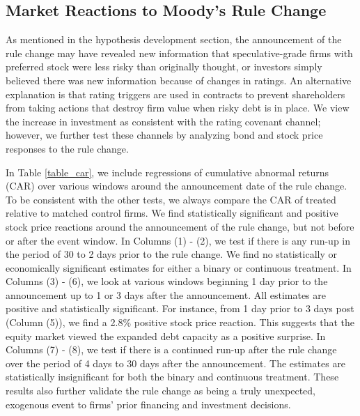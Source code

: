 \documentclass[a4paper, 12pt]{article}
\begin{document}
\subsection{Market Reactions to Moody's Rule Change} \label{subsec: market_response}

As mentioned in the hypothesis development section, the announcement of the rule change may have revealed new information that speculative-grade firms with preferred stock were less risky than originally thought, or investors simply believed there was new information because of changes in ratings. An alternative explanation is that rating triggers are used in contracts to prevent shareholders from taking actions that destroy firm value when risky debt is in place. We view the increase in investment as consistent with the rating covenant channel; however, we further test these channels by analyzing bond and stock price responses to the rule change.

In Table \ref{table_car}, we include regressions of cumulative abnormal returns (CAR) over various windows around the announcement date of the rule change. To be consistent with the other tests, we always compare the CAR of treated relative to matched control firms. We find statistically significant and positive stock price reactions around the announcement of the rule change, but not before or after the event window. In Columns (1) - (2), we test if there is any run-up in the period of 30 to 2 days prior to the rule change. We find no statistically or economically significant estimates for either a binary or continuous treatment. In Columns (3) - (6), we look at various windows beginning 1 day prior to the announcement up to 1 or 3 days after the announcement. All estimates are positive and statistically significant. For instance, from 1 day prior to 3 days post (Column (5)), we find a 2.8\% positive stock price reaction. This suggests that the equity market viewed the expanded debt capacity as a positive surprise. In Columns (7) - (8), we test if there is a continued run-up after the rule change over the period of 4 days to 30 days after the announcement. The estimates are statistically insignificant for both the binary and continuous treatment. These results also further validate the rule change as being a truly unexpected, exogenous event to firms' prior financing and investment decisions.
\end{document}
